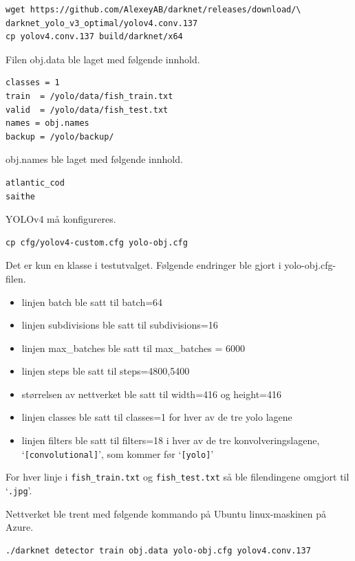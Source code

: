 \begin{verbatim}
wget https://github.com/AlexeyAB/darknet/releases/download/\
darknet_yolo_v3_optimal/yolov4.conv.137
cp yolov4.conv.137 build/darknet/x64
\end{verbatim}

Filen obj.data ble laget med følgende innhold.

\begin{lstlisting}[language={}, caption=obj.data]
classes = 1
train  = /yolo/data/fish_train.txt
valid  = /yolo/data/fish_test.txt
names = obj.names
backup = /yolo/backup/
\end{lstlisting}

obj.names ble laget med følgende innhold.

\begin{lstlisting}[language={}, caption=obj.names]
atlantic_cod
saithe
\end{lstlisting}

YOLOv4 må konfigureres.

\begin{verbatim}
cp cfg/yolov4-custom.cfg yolo-obj.cfg
\end{verbatim}

Det er kun en klasse i testutvalget. Følgende endringer ble gjort i yolo-obj.cfg-filen.

\begin{itemize}
  \item linjen batch ble satt til batch=64
  \item linjen subdivisions ble satt til subdivisions=16
  \item linjen max\_batches ble satt til max\_batches = 6000
  \item linjen steps ble satt til steps=4800,5400
  \item størrelsen av nettverket ble satt til width=416 og height=416
  \item linjen classes ble satt til classes=1 for hver av de tre yolo lagene
  \item linjen filters ble satt til filters=18 i hver av de tre konvolveringslagene, `\texttt{[convolutional]}', som kommer før `\texttt{[yolo]}'
\end{itemize}

For hver linje i \texttt{fish\_train.txt} og \texttt{fish\_test.txt} så ble filendingene omgjort til `\texttt{.jpg}'.

Nettverket ble trent med følgende kommando på Ubuntu linux-maskinen på Azure.

\begin{verbatim}
./darknet detector train obj.data yolo-obj.cfg yolov4.conv.137
\end{verbatim}

